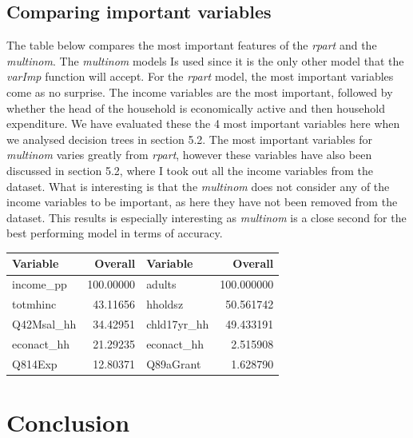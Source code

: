 \documentclass[11pt,preprint, authoryear]{elsarticle}
\let\origtable\table
\let\endorigtable\endtable
\renewenvironment{table}[1][2] {
    \expandafter\origtable\expandafter[H]
} {
    \endorigtable
}
\numberwithin{equation}{section}
\numberwithin{figure}{section}
\numberwithin{table}{section}
\begin{document}
\hypertarget{comparing-important-variables}{%
\subsection{Comparing important
variables}\label{comparing-important-variables}}

The table below compares the most important features of the \emph{rpart}
and the \emph{multinom}. The \emph{multinom} models Is used since it is
the only other model that the \emph{varImp} function will accept. For
the \emph{rpart} model, the most important variables come as no
surprise. The income variables are the most important, followed by
whether the head of the household is economically active and then
household expenditure. We have evaluated these the 4 most important
variables here when we analysed decision trees in section 5.2. The most
important variables for \emph{multinom} varies greatly from
\emph{rpart}, however these variables have also been discussed in
section 5.2, where I took out all the income variables from the dataset.
What is interesting is that the \emph{multinom} does not consider any of
the income variables to be important, as here they have not been removed
from the dataset. This results is especially interesting as
\emph{multinom} is a close second for the best performing model in terms
of accuracy.

\begin{table}

\caption{\label{tab:unnamed-chunk-4}Most important variables, `rpart` vs. `multinom`}
\centering
\begin{tabular}[t]{l|r|l|r}
\hline
Variable & Overall & Variable & Overall\\
\hline
income\_pp & 100.00000 & adults & 100.000000\\
\hline
totmhinc & 43.11656 & hholdsz & 50.561742\\
\hline
Q42Msal\_hh & 34.42951 & chld17yr\_hh & 49.433191\\
\hline
econact\_hh & 21.29235 & econact\_hh & 2.515908\\
\hline
Q814Exp & 12.80371 & Q89aGrant & 1.628790\\
\hline
\end{tabular}
\end{table}

\hypertarget{conclusion}{%
\section{Conclusion}\label{conclusion}}
\end{document}
